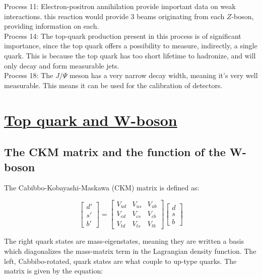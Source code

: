 \documentclass[11pt,a4paper]{article}
\begin{document}
Process 11: Electron-positron annihilation provide important data on weak interactions. this reaction would provide 3 beams originating from each $Z$-boson, providing information on each.\\

Process 14: The top-quark production present in this process is of significant importance, since the top quark offers a possibility to measure, indirectly, a single quark. This is because the top quark has too short lifetime to hadronize, and will only decay and form measurable jets.\\

Process 18: The $J/\Psi$ meson has a very narrow decay width, meaning it's very well measurable. This means it can be used for the calibration of detectors.


\section{\underline{Top quark and W-boson}}
\subsection{The CKM matrix and the function of the W-boson}
The Cabibbo-Kobayashi-Maskawa (CKM) matrix is defined as:


\begin{equation}
\begin{bmatrix}
d' \\ s' \\ b'
\end{bmatrix} =
\begin{bmatrix}
V_{ud} & V_{us} & V_{ub} \\
V_{cd} & V_{cs} & V_{cb} \\
V_{td} & V_{ts} & V_{tb}
\end{bmatrix}
\begin{bmatrix}
d \\ s \\ b
\end{bmatrix}
\label{CKM_matrix}
\end{equation}

The right quark states are mass-eigenstates, meaning they are written a basis which diagonalizes the mass-matrix term in the Lagrangian density function. The left, Cabbibo-rotated, quark states are what couple to up-type quarks. The matrix is given by the equation:
\end{document}
